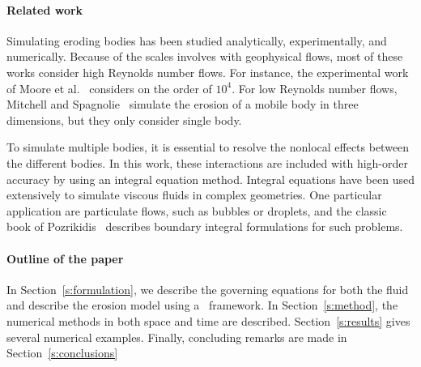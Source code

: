 \documentclass[preprint, 10pt]{elsarticle}
\begin{document}
\paragraph{Related work}
Simulating eroding bodies has been studied analytically, experimentally,
and numerically.  Because of the scales involves with geophysical flows,
most of these works consider high Reynolds number flows.  For instance,
the experimental work of Moore et al.~\cite{moo-ris-chi-zha-she2013}
considers on the order of $10^4$.  For low Reynolds number flows,
Mitchell and Spagnolie~\cite{mit-spa2016} simulate the erosion of a
mobile body in three dimensions, but they only consider single body.  

To simulate multiple bodies, it is essential to resolve the nonlocal
effects between the different bodies.  In this work, these interactions
are included with high-order accuracy by using an integral equation
method.  Integral equations have been used extensively to simulate
viscous fluids in complex geometries.  One particular application are
particulate flows, such as bubbles or droplets, and the classic book of
Pozrikidis~\cite{poz1992} describes boundary integral formulations for
such problems.


\paragraph{Outline of the paper}
In Section~\ref{s:formulation}, we describe the governing equations for
both the fluid and describe the erosion model using a \thL~framework.
In Section~\ref{s:method}, the numerical methods in both space and time
are described.  Section~\ref{s:results} gives several numerical
examples.  Finally, concluding remarks are made in
Section~\ref{s:conclusions}
\end{document}
